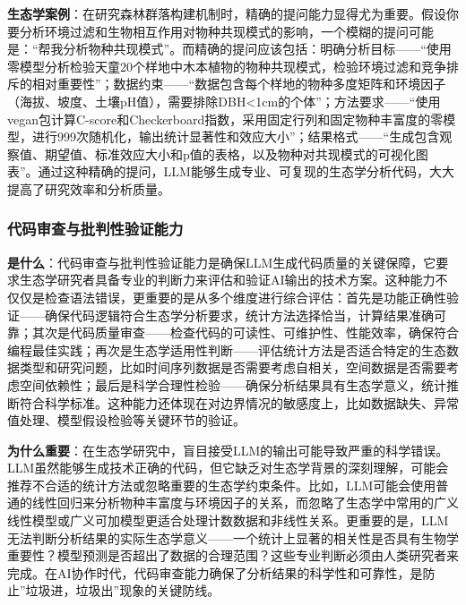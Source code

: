 \documentclass[
  twoside]{book}
\begin{document}
\textbf{生态学案例}：在研究森林群落构建机制时，精确的提问能力显得尤为重要。假设你要分析环境过滤和生物相互作用对物种共现模式的影响，一个模糊的提问可能是：``帮我分析物种共现模式''。而精确的提问应该包括：明确分析目标------``使用零模型分析检验天童20个样地中木本植物的物种共现模式，检验环境过滤和竞争排斥的相对重要性''；数据约束------``数据包含每个样地的物种多度矩阵和环境因子（海拔、坡度、土壤pH值），需要排除DBH\textless1cm的个体''；方法要求------``使用vegan包计算C-score和Checkerboard指数，采用固定行列和固定物种丰富度的零模型，进行999次随机化，输出统计显著性和效应大小''；结果格式------``生成包含观察值、期望值、标准效应大小和p值的表格，以及物种对共现模式的可视化图表''。通过这种精确的提问，LLM能够生成专业、可复现的生态学分析代码，大大提高了研究效率和分析质量。

\hypertarget{ux4ee3ux7801ux5ba1ux67e5ux4e0eux6279ux5224ux6027ux9a8cux8bc1ux80fdux529b}{%
\subsubsection{代码审查与批判性验证能力}\label{ux4ee3ux7801ux5ba1ux67e5ux4e0eux6279ux5224ux6027ux9a8cux8bc1ux80fdux529b}}

\textbf{是什么}：代码审查与批判性验证能力是确保LLM生成代码质量的关键保障，它要求生态学研究者具备专业的判断力来评估和验证AI输出的技术方案。这种能力不仅仅是检查语法错误，更重要的是从多个维度进行综合评估：首先是功能正确性验证------确保代码逻辑符合生态学分析要求，统计方法选择恰当，计算结果准确可靠；其次是代码质量审查------检查代码的可读性、可维护性、性能效率，确保符合编程最佳实践；再次是生态学适用性判断------评估统计方法是否适合特定的生态数据类型和研究问题，比如时间序列数据是否需要考虑自相关，空间数据是否需要考虑空间依赖性；最后是科学合理性检验------确保分析结果具有生态学意义，统计推断符合科学标准。这种能力还体现在对边界情况的敏感度上，比如数据缺失、异常值处理、模型假设检验等关键环节的验证。

\textbf{为什么重要}：在生态学研究中，盲目接受LLM的输出可能导致严重的科学错误。LLM虽然能够生成技术正确的代码，但它缺乏对生态学背景的深刻理解，可能会推荐不合适的统计方法或忽略重要的生态学约束条件。比如，LLM可能会使用普通的线性回归来分析物种丰富度与环境因子的关系，而忽略了生态学中常用的广义线性模型或广义可加模型更适合处理计数数据和非线性关系。更重要的是，LLM无法判断分析结果的实际生态学意义------一个统计上显著的相关性是否具有生物学重要性？模型预测是否超出了数据的合理范围？这些专业判断必须由人类研究者来完成。在AI协作时代，代码审查能力确保了分析结果的科学性和可靠性，是防止''垃圾进，垃圾出''现象的关键防线。
\end{document}
